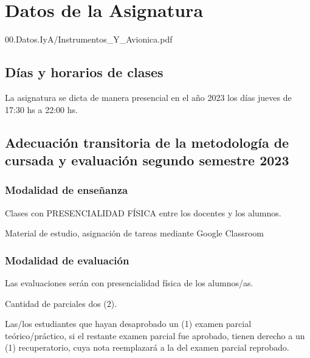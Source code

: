 %

\chapter*{Datos de la Asignatura}
\label{chap:00.datos.de.IyA}

  
  {00.Datos.IyA/Instrumentos_Y_Avionica.pdf}


\section{Días y horarios de clases}
\label{sec:dias+horarios.clases}

La asignatura se dicta de manera presencial en el año 2023
los días jueves de 17:30 hs a 22:00 hs.




\section*{Adecuación transitoria de la metodología de cursada  y evaluación segundo semestre 2023}
\label{00.Adecuacion.transitoria}


\subsection*{Modalidad de enseñanza} 

Clases con PRESENCIALIDAD FÍSICA entre los docentes y los alumnos.

Material de estudio, asignación de tareas mediante Google Classroom

\subsection*{Modalidad de evaluación}

Las evaluaciones serán con presencialidad física de los alumnos/as.

Cantidad de parciales dos (2).

Las/los estudiantes que hayan desaprobado un (1) examen parcial teórico/práctico, si el restante examen parcial fue aprobado, tienen derecho a un (1) recuperatorio, cuya nota reemplazará a la del examen parcial reprobado.

